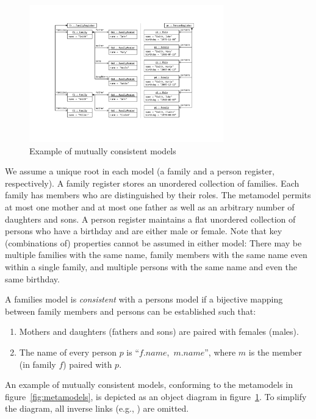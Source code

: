 \begin{figure}[tb!]
	\centering
	\includegraphics[width=0.75\textwidth]{diagrams/Models}
	\caption{Example of mutually consistent models}
	\label{fig:models}
\end{figure}

We assume a unique root in each model (a family and a person register, respectively). 
A family register stores an unordered collection of families. 
Each family has members who are distinguished by their roles. 
The metamodel permits at most one mother and at most one father as well as an arbitrary number of daughters and sons. 
A person register maintains a flat unordered collection of persons who have a birthday and are either male or female. 
Note that key (combinations of) properties cannot be assumed in either model: There may be multiple families with the same name, family members with the same name even within a single family, and multiple persons with the same name and even the same birthday. 

A families model is \emph{consistent} with a persons model if a bijective mapping between family members and persons can be established such that:

\begin{enumerate}
	\item  Mothers and daughters (fathers and sons) are paired with females (males).
	\item  The name of every person $p$ is ``$f.name$,~$m.name$'', where $m$ is the member (in family $f$) paired with $p$.
\end{enumerate}

An example of mutually consistent models, conforming to the metamodels in figure~\ref{fig:metamodels}, is depicted as an object diagram in figure~\ref{fig:models}. 
To simplify the diagram, all inverse links (e.g., ) are omitted.


